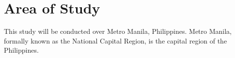 \section{Area of Study}
	This study will be conducted over Metro Manila, Philippines.
	Metro Manila, formally known as the National Capital Region, is the capital region of the Philippines.